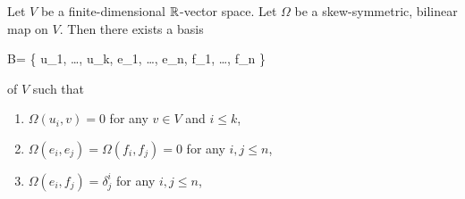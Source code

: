 \documentclass[main.tex]{subfiles}
\begin{document}
\begin{theorem}
\label{th:decomp_th}
	Let $V$ be a finite-dimensional $\mathbb{R}$-vector space. Let $\Omega$ be a skew-symmetric, bilinear map on $V$. Then there exists a basis
	\begin{eqalign}
		B= \{ u_1, \ldots, u_k, e_1, \ldots, e_n, f_1, \ldots, f_n \}
	\end{eqalign}
	of $V$ such that
	\begin{enumerate}
		\item $\Omega(u_i, v) = 0$ for any $v \in V$ and $i \leq k$,
		\item $\Omega(e_i, e_j) = \Omega(f_i, f_j) = 0$ for any $i, j \leq n$,
		\item $\Omega(e_i, f_j) = \delta^i_j$ for any $i, j \leq n$,
	\end{enumerate}
\end{theorem}
\end{document}
